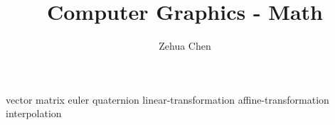 \documentclass[letterpaper, 11pt]{report}
\title{Computer Graphics - Math}
\author{Zehua Chen}
\begin{document}
  \maketitle
  \tableofcontents

  {vector}
  {matrix}
  {euler}
  {quaternion}
  {linear-transformation}
  {affine-transformation}
  {interpolation}
\end{document}
